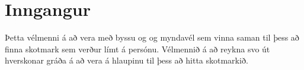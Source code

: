 \section{Inngangur}
Þetta vélmenni á að vera með byssu og og myndavél sem vinna saman til þess að finna skotmark sem verður límt á persónu. Vélmennið á að reykna svo út hverskonar gráða á að vera á hlaupinu til þess að hitta skotmarkið.

\iffalse
Skoðaði code complete /cite{mcconnell2004code}
Svo er líka hægt að nota tilvitnanir í vef \cite{WinNT}
eða tilvitnanir í bók um Rasberrypi \cite{brock2013changing}
eða tilvitnanir í bók um Rasberrypi \cite{test}
eða tilvitnanir í bók um Rasberrypi \cite{test2}
\begin{figure}[h]
\texttt{[image: img/system]}
\end{figure}
\fi